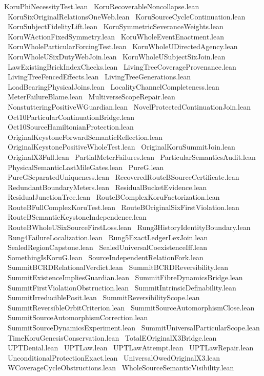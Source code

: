 KoruPhiNecessityTest.lean \
KoruRecoverableNoncollapse.lean \
KoruSixOriginalRelationsOneWeb.lean \
KoruSourceCycleContinuation.lean \
KoruSubjectFidelityLift.lean \
KoruSymmetricSeveranceWeights.lean \
KoruWActionFixedSymmetry.lean \
KoruWholeEventEnactment.lean \
KoruWholeParticularForcingTest.lean \
KoruWholeUDirectedAgency.lean \
KoruWholeUSixDutyWebJoin.lean \
KoruWholeUSubjectSixJoin.lean \
LawExistingBrickIndexChecks.lean \
LivingTreeCoverageProvenance.lean \
LivingTreeFencedEffects.lean \
LivingTreeGenerations.lean \
LoadBearingPhysicalJoins.lean \
LocalityChannelCompleteness.lean \
MeterFailureBlame.lean \
MultiverseScopeRepair.lean \
NonstutteringPositiveWGuardian.lean \
NovelProtectedContinuationJoin.lean \
Oct10ParticularContinuationBridge.lean \
Oct10SourceHamiltonianProtection.lean \
OriginalKeystoneForwardSemanticReflection.lean \
OriginalKeystonePositiveWholeTest.lean \
OriginalKoruSummitJoin.lean \
OriginalX3Full.lean \
PartialMeterFailures.lean \
ParticularSemanticsAudit.lean \
PhysicalSemanticLastMileGates.lean \
PureG.lean \
PureGSeparatedUniqueness.lean \
RecoveredRouteBSourceCertificate.lean \
RedundantBoundaryMeters.lean \
ResidualBucketEvidence.lean \
ResidualJunctionTree.lean \
RouteBComplexKoruFactorization.lean \
RouteBFullComplexKoruTest.lean \
RouteBOriginalSixFirstViolation.lean \
RouteBSemanticKeystoneIndependence.lean \
RouteBWholeUSixSourceFirstLoss.lean \
Rung3HistoryIdentityBoundary.lean \
Rung4FailureLocalization.lean \
Rung5ExactLedgerLexJoin.lean \
SealedRegionCapstone.lean \
SealedUniversalCoexistenceIff.lean \
SomethingIsKoruG.lean \
SourceIndependentRelationFork.lean \
SummitBCRDRelationalVerdict.lean \
SummitBCRDReversibility.lean \
SummitExistenceImpliesGuardian.lean \
SummitFibreDynamicsBridge.lean \
SummitFirstViolationObstruction.lean \
SummitIntrinsicDefinability.lean \
SummitIrreduciblePosit.lean \
SummitReversibilityScope.lean \
SummitReversibleOrbitCriterion.lean \
SummitSourceAutomorphismClose.lean \
SummitSourceAutomorphismCorrection.lean \
SummitSourceDynamicsExperiment.lean \
SummitUniversalParticularScope.lean \
TimeKoruGenesisConservation.lean \
TotalEOriginalX3Bridge.lean \
UPTDenial.lean \
UPTLaw.lean \
UPTLawAttempt.lean \
UPTLawRepair.lean \
UnconditionalProtectionExact.lean \
UniversalOwedOriginalX3.lean \
WCoverageCycleObstructions.lean \
WholeSourceSemanticVisibility.lean \

